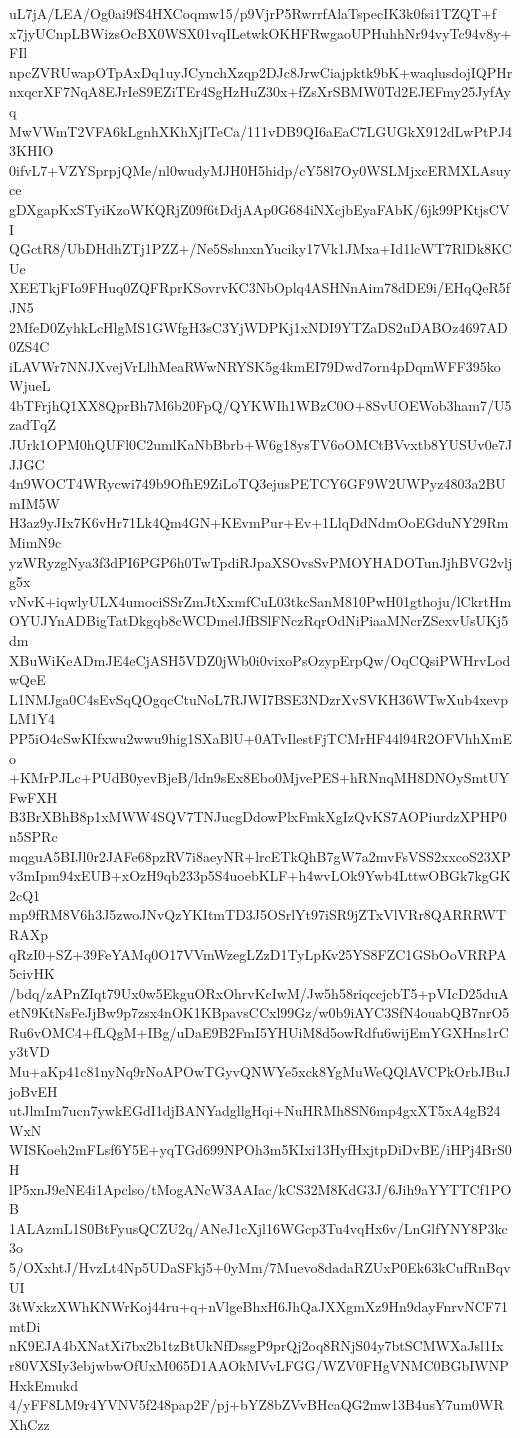 uL7jA/LEA/Og0ai9fS4HXCoqmw15/p9VjrP5RwrrfAlaTspecIK3k0fsi1TZQT+f
x7jyUCnpLBWizsOcBX0WSX01vqILetwkOKHFRwgaoUPHuhhNr94vyTc94v8y+FIl
npcZVRUwapOTpAxDq1uyJCynchXzqp2DJc8JrwCiajpktk9bK+waqlusdojIQPHr
nxqcrXF7NqA8EJrIeS9EZiTEr4SgHzHuZ30x+fZsXrSBMW0Td2EJEFmy25JyfAyq
MwVWmT2VFA6kLgnhXKhXjITeCa/111vDB9QI6aEaC7LGUGkX912dLwPtPJ43KHIO
0ifvL7+VZYSprpjQMe/nl0wudyMJH0H5hidp/cY58l7Oy0WSLMjxcERMXLAsuyce
gDXgapKxSTyiKzoWKQRjZ09f6tDdjAAp0G684iNXcjbEyaFAbK/6jk99PKtjsCVI
QGctR8/UbDHdhZTj1PZZ+/Ne5SshnxnYuciky17Vk1JMxa+Id1lcWT7RlDk8KCUe
XEETkjFIo9FHuq0ZQFRprKSovrvKC3NbOplq4ASHNnAim78dDE9i/EHqQeR5fJN5
2MfeD0ZyhkLcHlgMS1GWfgH3sC3YjWDPKj1xNDI9YTZaDS2uDABOz4697AD0ZS4C
iLAVWr7NNJXvejVrLlhMeaRWwNRYSK5g4kmEI79Dwd7orn4pDqmWFF395koWjueL
4bTFrjhQ1XX8QprBh7M6b20FpQ/QYKWIh1WBzC0O+8SvUOEWob3ham7/U5zadTqZ
JUrk1OPM0hQUFl0C2umlKaNbBbrb+W6g18ysTV6oOMCtBVvxtb8YUSUv0e7JJJGC
4n9WOCT4WRycwi749b9OfhE9ZiLoTQ3ejusPETCY6GF9W2UWPyz4803a2BUmIM5W
H3az9yJIx7K6vHr71Lk4Qm4GN+KEvmPur+Ev+1LlqDdNdmOoEGduNY29RmMimN9c
yzWRyzgNya3f3dPI6PGP6h0TwTpdiRJpaXSOvsSvPMOYHADOTunJjhBVG2vljg5x
vNvK+iqwlyULX4umociSSrZmJtXxmfCuL03tkcSanM810PwH01gthoju/lCkrtHm
OYUJYnADBigTatDkgqb8cWCDmelJfBSlFNczRqrOdNiPiaaMNcrZSexvUsUKj5dm
XBuWiKeADmJE4eCjASH5VDZ0jWb0i0vixoPsOzypErpQw/OqCQsiPWHrvLodwQeE
L1NMJga0C4sEvSqQOgqcCtuNoL7RJWI7BSE3NDzrXvSVKH36WTwXub4xevpLM1Y4
PP5iO4cSwKIfxwu2wwu9hig1SXaBlU+0ATvIlestFjTCMrHF44l94R2OFVhhXmEo
+KMrPJLc+PUdB0yevBjeB/ldn9sEx8Ebo0MjvePES+hRNnqMH8DNOySmtUYFwFXH
B3BrXBhB8p1xMWW4SQV7TNJucgDdowPlxFmkXgIzQvKS7AOPiurdzXPHP0n5SPRc
mqguA5BIJl0r2JAFe68pzRV7i8aeyNR+lrcETkQhB7gW7a2mvFsVSS2xxcoS23XP
v3mIpm94xEUB+xOzH9qb233p5S4uoebKLF+h4wvLOk9Ywb4LttwOBGk7kgGK2cQ1
mp9fRM8V6h3J5zwoJNvQzYKItmTD3J5OSrlYt97iSR9jZTxVlVRr8QARRRWTRAXp
qRzI0+SZ+39FeYAMq0O17VVmWzegLZzD1TyLpKv25YS8FZC1GSbOoVRRPA5civHK
/bdq/zAPnZIqt79Ux0w5EkguORxOhrvKcIwM/Jw5h58riqccjcbT5+pVIcD25duA
etN9KtNsFeJjBw9p7zsx4nOK1KBpavsCCxl99Gz/w0b9iAYC3SfN4ouabQB7nrO5
Ru6vOMC4+fLQgM+IBg/uDaE9B2FmI5YHUiM8d5owRdfu6wijEmYGXHns1rCy3tVD
Mu+aKp41c81nyNq9rNoAPOwTGyvQNWYe5xck8YgMuWeQQlAVCPkOrbJBuJjoBvEH
utJlmIm7ucn7ywkEGdI1djBANYadgllgHqi+NuHRMh8SN6mp4gxXT5xA4gB24WxN
WISKoeh2mFLsf6Y5E+yqTGd699NPOh3m5KIxi13HyfHxjtpDiDvBE/iHPj4BrS0H
lP5xnJ9eNE4i1Apclso/tMogANcW3AAIac/kCS32M8KdG3J/6Jih9aYYTTCf1POB
1ALAzmL1S0BtFyusQCZU2q/ANeJ1cXjl16WGcp3Tu4vqHx6v/LnGlfYNY8P3kc3o
5/OXxhtJ/HvzLt4Np5UDaSFkj5+0yMm/7Muevo8dadaRZUxP0Ek63kCufRnBqvUI
3tWxkzXWhKNWrKoj44ru+q+nVlgeBhxH6JhQaJXXgmXz9Hn9dayFnrvNCF71mtDi
nK9EJA4bXNatXi7bx2b1tzBtUkNfDssgP9prQj2oq8RNjS04y7btSCMWXaJsl1Ix
r80VXSIy3ebjwbwOfUxM065D1AAOkMVvLFGG/WZV0FHgVNMC0BGbIWNPHxkEmukd
4/yFF8LM9r4YVNV5f248pap2F/pj+bYZ8bZVvBHcaQG2mw13B4usY7um0WRXhCzz

